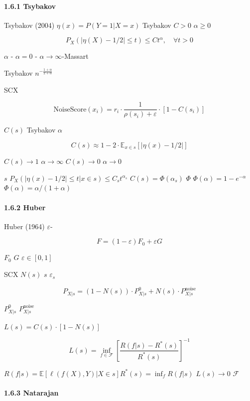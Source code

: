 \documentclass[
  12pt,
]{article}
\begin{document}
\paragraph{1.6.1 Tsybakov
}\label{tsybakov-ux566aux58f0ux6761ux4ef6}

Tsybakov (2004) 
\(\eta(x) = P(Y=1|X=x)\) Tsybakov  \(C > 0\) 
\(\alpha \geq 0\)

\[P_X\left(|\eta(X) - 1/2| \leq t\right) \leq C t^\alpha, \quad \forall t > 0\]

\(\alpha\)  -
\(\alpha = 0\) -
\(\alpha \to \infty\)-Massart 

 Tsybakov 
\(n^{-\frac{1+\alpha}{2+\alpha}}\)

SCX  \textbf{}

\[\text{NoiseScore}(x_i) = r_i \cdot \frac{1}{\rho(s_i) + \varepsilon} \cdot [1 - C(s_i)]\]

 \(C(s)\) Tsybakov  \(\alpha\) 

\[C(s) \approx 1 - 2 \cdot \mathbb{E}_{x \in s}[|\eta(x) - 1/2|]\]

 \(C(s) \to 1\)
\(\alpha \to \infty\)
\(C(s) \to 0\) \(\alpha \to 0\)

 \(s\) 
\(P_X(|\eta(x)-1/2| \leq t | x \in s) \leq C_s t^{\alpha_s}\)
\(C(s) = \Phi(\alpha_s)\) \(\Phi\) 
\(\Phi(\alpha) = 1 - e^{-\alpha}\) 
\(\Phi(\alpha) = \alpha/(1+\alpha)\)

\paragraph{1.6.2 Huber }\label{huber-ux6c61ux67d3ux6a21ux578b}

Huber (1964)  \(\varepsilon\)-

\[F = (1 - \varepsilon) F_0 + \varepsilon G\]

 \(F_0\) \(G\) \(\varepsilon \in [0, 1]\)


SCX  \(N(s)\)  \(s\)  \(\varepsilon_s\)

\[P_{X|s} = (1 - N(s)) \cdot P_{X|s}^0 + N(s) \cdot P_{X|s}^{\text{noise}}\]

 \(P_{X|s}^0\) \(P_{X|s}^{\text{noise}}\)


\textbf{} \(L(s) = C(s) \cdot [1 - N(s)]\) 

\[L(s) = \inf_{f \in \mathcal{F}} \left[ \frac{R(f|s) - R^*(s)}{R^*(s)} \right]^{-1}\]


\(R(f|s) = \mathbb{E}[\ell(f(X), Y) | X \in s]\)\(R^*(s) = \inf_f R(f|s)\)
\(L(s) \to 0\)  \(\mathcal{F}\)


\paragraph{1.6.3 Natarajan
}\label{natarajan-ux7ef4ux5ea6ux4e0eux566aux58f0}
\end{document}
